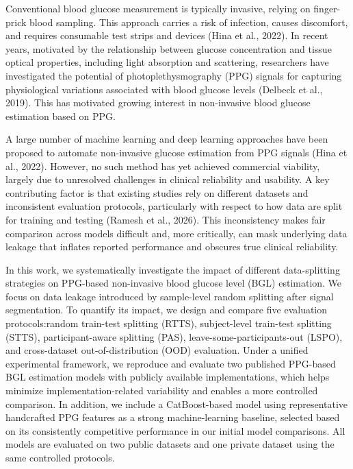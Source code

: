 \documentclass{article}
\begin{document}
Conventional blood glucose measurement is typically invasive, relying on finger-prick blood sampling. This approach carries a risk of infection, causes discomfort, and requires consumable test strips and devices (Hina et al., 2022). In recent years, motivated by the relationship between glucose concentration
and tissue optical properties, including light absorption and scattering,
researchers have investigated the potential of photoplethysmography (PPG)
signals for capturing physiological variations associated with blood glucose
levels (Delbeck et al., 2019). This has motivated growing interest in non-invasive blood glucose estimation based on PPG.

A large number of machine learning and deep learning approaches have been proposed to automate non-invasive glucose estimation from PPG signals (Hina et al., 2022). However, no such method has yet achieved commercial viability, largely due to unresolved challenges in clinical reliability and usability. A key contributing factor is that existing studies rely on different datasets and inconsistent evaluation protocols, particularly with respect to how data are split for training and testing (Ramesh et al., 2026). This inconsistency makes fair comparison across models difficult and, more critically, can mask underlying data leakage that inflates reported performance and obscures true clinical reliability.

In this work, we systematically investigate the impact of different data-splitting strategies on PPG-based non-invasive blood glucose level (BGL) estimation. We focus on data leakage introduced by sample-level random splitting after signal segmentation. To quantify its impact, we design and compare five evaluation protocols:random train-test splitting (RTTS), subject-level train-test splitting (STTS), participant-aware splitting (PAS), leave-some-participants-out (LSPO), and cross-dataset out-of-distribution (OOD) evaluation. Under a unified experimental framework, we reproduce and evaluate two published PPG-based BGL estimation models with publicly available implementations, which helps minimize implementation-related variability and enables a more controlled comparison. In addition, we include a CatBoost-based model using representative handcrafted PPG features as a strong machine-learning baseline, selected based on its consistently competitive performance in our initial model comparisons. All models are evaluated on two public datasets and one private dataset using the same controlled protocols.
\end{document}
